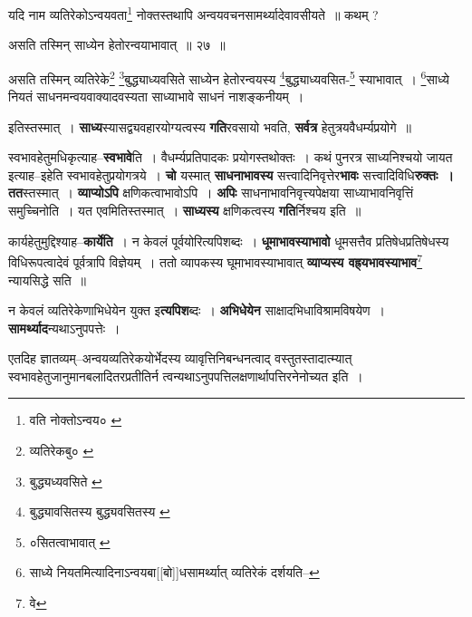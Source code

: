 \documentclass[article,12pt,a4paper]{memoir}
\begin{document}
	  \pstart यदि नाम व्यतिरेकोऽन्वयवता\footnote{वति नोक्तोऽन्वय० \cite{dp-msA} \cite{dp-edP} \cite{dp-edE} \cite{dp-msC}} नोक्तस्तथापि अन्वयवचनसामर्थ्यादेवावसीयते ॥ कथम् ?
	\pend
       
	  \bigskip
	  \begingroup
	

	  \pstart असति तस्मिन् साध्येन हेतोरन्वयाभावात् ॥ २७ ॥
	\pend
      
	  \endgroup
	 

	  \pstart असति तस्मिन् व्यतिरेके\footnote{व्यतिरेकबु० \cite{dp-msA}} \footnote{बुद्ध्यध्यवसिते \cite{dp-msA} \cite{dp-msB} \cite{dp-edP} \cite{dp-edH} \cite{dp-edE} \cite{dp-edN}}बुद्ध्याध्यवसिते साध्येन हेतोरन्वयस्य \footnote{बुद्ध्यावसितस्य \cite{dp-msA} \cite{dp-edP} \cite{dp-edH} \cite{dp-edE} \cite{dp-edN} बुद्ध्यवसितस्य \cite{dp-msB} \cite{dp-msD}}बुद्ध्याध्यवसित-\footnote{०सितत्वाभावात् \cite{dp-msC}} स्याभावात् । \footnote{साध्ये नियतमित्यादिनाऽन्वयबा[[बो]]धसामर्थ्यात् व्यतिरेकं दर्शयति--\cite{dp-msD-n}}साध्ये नियतं साधनमन्वयवाक्यादवस्यता साध्याभावे साधनं नाशङ्कनीयम् ।
	\pend
      
	  \endgroup
	

	  \pstart इतिस्तस्मात् । \textbf{साध्य}स्यासद्व्यवहारयोग्यत्वस्य \textbf{गति}रवसायो भवति, \textbf{सर्वत्र} हेतुत्रयवैधर्म्यप्रयोगे ॥
	\pend
      

	  \pstart स्वभावहेतुमधिकृत्याह--\textbf{स्वभावे}ति । वैधर्म्यप्रतिपादकः प्रयोगस्तथोक्तः । कथं पुनरत्र साध्यनिश्चयो जायत इत्याह--इहेति स्वभावहेतुप्रयोगत्रये । \textbf{चो} यस्मात् \textbf{साधनाभावस्य} सत्त्वादिनिवृत्तेर\textbf{भावः} सत्त्वादिविधि\textbf{रुक्तः । तत}स्तस्मात् । \textbf{व्याप्योऽपि} क्षणिकत्वाभावोऽपि । \textbf{अपिः} साधनाभावनिवृत्त्यपेक्षया साध्याभावनिवृत्तिं समुच्चिनोति । यत एवमितिस्तस्मात् । \textbf{साध्यस्य} क्षणिकत्वस्य \textbf{गति}र्निश्चय इति ॥
	\pend
      

	  \pstart कार्यहेतुमुद्दिश्याह--\textbf{कार्येति} । न केवलं पूर्वयोरित्यपिशब्दः । \textbf{धूमाभावस्याभावो} धूमसत्तैव प्रतिषेधप्रतिषेधस्य विधिरूपत्वादेवं पूर्वत्रापि विज्ञेयम् । ततो व्यापकस्य घूमाभावस्याभावात् \textbf{व्याप्यस्य वह्र्यभावस्याभाव}\footnote{वे} न्यायसिद्धे सति ॥
	\pend
      

	  \pstart न केवलं व्यतिरेकेणाभिधेयेन युक्त इ\textbf{त्यपिश}ब्दः । \textbf{अभिधेयेन} साक्षादभिधाविश्रामविषयेण । \textbf{सामर्थ्याद}न्यथाऽनुपपत्तेः ।
	\pend
      

	  \pstart एतदिह ज्ञातव्यम्--अन्वयव्यतिरेकयोर्भेदस्य व्यावृत्तिनिबन्धनत्वाद् वस्तुतस्तादात्म्यात् स्वभावहेतुजानुमानबलादितरप्रतीतिर्न त्वन्यथाऽनुपपत्तिलक्षणार्थापत्तिरनेनोच्यत इति ।
	\pend
      \leavevmode{}
	  \bigskip
	  \begingroup
	
\end{document}

